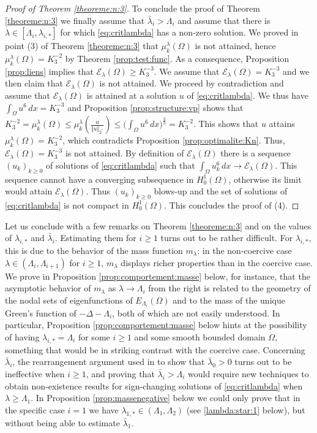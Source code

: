 \documentclass[10pt]{amsart}
\numberwithin{equation}{section}
\newcommand{\Om}{\Omega}
\newcommand{\mkl}{\mu_{k}^{\lambda}}
\theoremstyle{plain}
\theoremstyle{remark}
\begin{document}
\begin{proof}[Proof of Theorem \ref{theoreme:n:3}]
To conclude the proof of Theorem \ref{theoreme:n:3} we finally assume that $\bar{\lambda}_i > \Lambda_i$ and assume that there is $\lambda \in [\Lambda_i, \lambda_{i,*}]$ for which \eqref{eq:critlambda} has a non-zero solution. We proved in point (3) of Theorem \ref{theoreme:n:3} that $\mkl(\Om)$ is not attained, hence $\mkl(\Om) = K_3^{-2}$ by Theorem \ref{prop:test:func}. As a consequence, Proposition \ref{prop:liens} implies that $\mathcal{E}_\lambda(\Om) \ge K_3^{-3}$. We assume that $\mathcal{E}_\lambda(\Om) = K_3^{-3}$ and we then claim that $\mathcal{E}_\lambda(\Om)$ is not attained. We proceed by contradiction and assume that $\mathcal{E}_\lambda(\Om)$ is attained at a solution $u$ of \eqref{eq:critlambda}. We thus have $\int_{\Om} u^6 \, dx = K_3^{-3}$ and Proposition \ref{prop:structure:vp} shows that $K_3^{-2} = \mkl(\Om) \le \mkl(\frac{u}{\Vert u \Vert_{2^*}}) \le \big( \int_{\Om} u^6 \, dx \big)^{\frac23} = K_3^{-2}$. This shows that  $u$ attains $\mkl(\Om) = K_3^{-2}$, which contradicts Proposition \ref{prop:optimalite:Kn}. Thus, $\mathcal{E}_\lambda(\Om) = K_3^{-3}$ is not attained. By definition of  $\mathcal{E}_\lambda(\Om)$ there is a sequence $(u_k)_{k \ge0}$ of solutions of \eqref{eq:critlambda} such that $\int_{\Om} u_k^6\, dx \to \mathcal{E}_\lambda(\Om)$. This sequence cannot have a converging subsequence in $H^1_0(\Om)$, otherwise its limit would attain $\mathcal{E}_\lambda(\Om)$. Thus $(u_k)_{k \ge0}$ blows-up and the set of solutions of \eqref{eq:critlambda} is not compact in $H^1_0(\Om)$. This concludes the proof of (4). 
\end{proof}

Let us conclude with a few remarks on Theorem \ref{theoreme:n:3} and on the values of $\lambda_{i,*}$ and $\bar{\lambda}_i$. Estimating them for $i \ge 1$ turns out to be rather difficult. For $\lambda_{i,*}$, this is due to the behavior of the mass function $m_\lambda$: in the non-coercive case $\lambda \in (\Lambda_i, \Lambda_{i+1})$ for $i \ge 1$,  $m_\lambda$ displays richer properties than in the coercive case. We prove in Proposition \ref{prop:comportement:masse} below, for instance, that the asymptotic behavior of $m_\lambda$ as $\lambda \to \Lambda_i$ from the right is related to the geometry of the nodal sets of eigenfunctions of $E_{\Lambda_i}(\Om)$ and to the mass of the unique Green's function of $- \Delta - \Lambda_i$, both of which are not easily understood. In particular, Proposition \ref{prop:comportement:masse} below hints at the possibility of having $\lambda_{i,*} = \Lambda_i$ for some $i \ge 1$ and some smooth bounded domain $\Om$, something that would be in striking contrast with the coercive case. Concerning $\bar{\lambda}_i$, the rearrangement argument used in \cite{BN} to show that $\bar{\lambda}_0 >0$ turns out to be ineffective when $i \ge 1$, and proving that $\bar{\lambda}_i > \Lambda_i$ would require new techniques to obtain non-existence results for sign-changing solutions of \eqref{eq:critlambda} when $\lambda \ge \Lambda_1$. In Proposition \ref{prop:massenegative} below we could only prove that in the specific case $i=1$ we have $\lambda_{1,*} \in (\Lambda_1, \Lambda_2)$ (see \eqref{lambda:star:1} below), but without being able to estimate $\bar{\lambda}_1$. 
\end{document}
